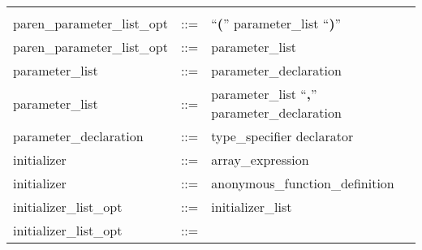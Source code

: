 \begin{longtable}{lrl}
\begin{minipage}[t]{\rulerhs}
  \end{minipage}                                                             \\
paren\_parameter\_list\_opt                & ::= &
  \begin{minipage}[t]{\rulerhs}
    \raggedright
    ``{\bf (}'' parameter\_list ``{\bf )}''
  \end{minipage}                                                             \\
paren\_parameter\_list\_opt                & ::= &
  \begin{minipage}[t]{\rulerhs}
    \raggedright
    parameter\_list
  \end{minipage}                                                             \\
parameter\_list                            & ::= &
  \begin{minipage}[t]{\rulerhs}
    \raggedright
    parameter\_declaration
  \end{minipage}                                                             \\
parameter\_list                            & ::= &
  \begin{minipage}[t]{\rulerhs}
    \raggedright
    parameter\_list ``{\bf ,}'' parameter\_declaration
  \end{minipage}                                                             \\
parameter\_declaration                     & ::= &
  \begin{minipage}[t]{\rulerhs}
    \raggedright
    type\_specifier declarator
  \end{minipage}                                                             \\
initializer                                & ::= &
  \begin{minipage}[t]{\rulerhs}
    \raggedright
    array\_expression
  \end{minipage}                                                             \\
initializer                                & ::= &
  \begin{minipage}[t]{\rulerhs}
    \raggedright
    anonymous\_function\_definition
  \end{minipage}                                                             \\
initializer\_list\_opt                     & ::= &
  \begin{minipage}[t]{\rulerhs}
    \raggedright
    initializer\_list
  \end{minipage}                                                             \\
initializer\_list\_opt                     & ::= &
  \begin{minipage}[t]{\rulerhs}
    \raggedright
    

\end{minipage}
\end{longtable}
